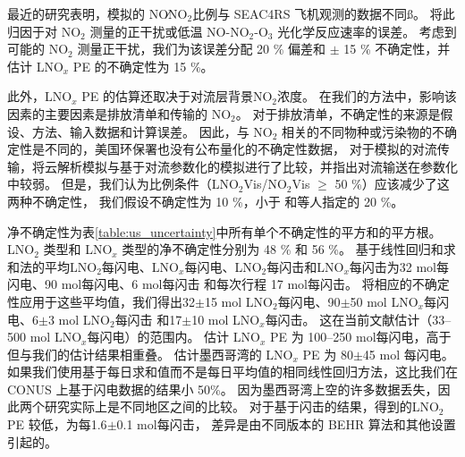 最近的研究表明，模拟的 NO∕NO$_2$比例与 SEAC4RS 飞机观测的数据不同\citep{Travis.2016,Silvern.2018}ß。
\citet{Silvern.2018}将此归因于对 NO$_2$ 测量的正干扰或低温 NO-NO$_2$-O$_3$ 光化学反应速率的误差。
考虑到可能的 NO$_2$ 测量正干扰\citep{Allen.2019,Bucsela.2019}，我们为该误差分配 20 \% 偏差和 $\pm$ 15 \% 不确定性，并估计 LNO$_x$ PE 的不确定性为 15 \%。

此外，LNO$_x$ PE 的估算还取决于对流层背景NO$_2$浓度。
在我们的方法中，影响该因素的主要因素是排放清单和传输的 NO$_2$。
对于排放清单，不确定性的来源是假设、方法、输入数据和计算误差。
因此，与 NO$_2$ 相关的不同物种或污染物的不确定性是不同的，美国环保署也没有公布量化的不确定性数据，
对于模拟的对流传输，\citet{Li.2018}将云解析模拟与基于对流参数化的模拟进行了比较，并指出对流输送在参数化中较弱。
但是，我们认为比例条件（LNO$_2$Vis/NO$_2$Vis $\geq$ 50 \%）应该减少了这两种不确定性，
我们假设不确定性为 10 \%，小于 \citet{Allen.2019}和\citet{Bucsela.2019}等人指定的 20 \%。

净不确定性为表\ref{table:us_uncertainty}中所有单个不确定性的平方和的平方根。
LNO$_2$ 类型和 LNO$_x$ 类型的净不确定性分别为 48 \% 和 56 \%。
基于线性回归和求和法的平均LNO$_2$每闪电、LNO$_x$每闪电、LNO$_2$每闪击和LNO$_x$每闪击为32 mol每闪电、90 mol每闪电、6 mol每闪击 和每次行程 17 mol每闪击。
将相应的不确定性应用于这些平均值，我们得出32$\pm$15 mol LNO$_2$每闪电、90$\pm$50 mol LNO$_x$每闪电、6$\pm$3 mol LNO$_2$每闪击 和17$\pm$10 mol LNO$_x$每闪击。
这在当前文献估计（33--500 mol LNO$_x$每闪电）的范围内\citep{Schumann.2007,Beirle.2010,Bucsela.2010}。
\citet{Bucsela.2010}估计 LNO$_x$ PE 为 100--250 mol每闪电，高于但与我们的估计结果相重叠。
\citet{Pickering.2016}估计墨西哥湾的 LNO$_x$ PE 为 80$\pm$45 mol 每闪电。
如果我们使用基于每日求和值而不是每日平均值的相同线性回归方法，这比我们在 CONUS 上基于闪电数据的结果小 50\%。
因为墨西哥湾上空的许多数据丢失，因此两个研究实际上是不同地区之间的比较。
对于基于闪击的结果，\citet{Lapierre.2020}得到的LNO$_2$ PE 较低，为每1.6$\pm$0.1 mol每闪击，
差异是由不同版本的 BEHR 算法和其他设置引起的。


